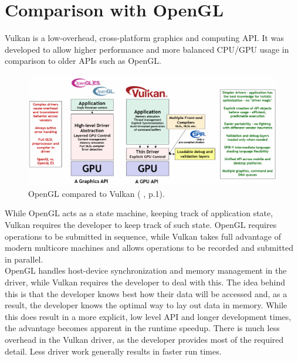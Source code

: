 \documentclass[12pt]{report}
\newcommand{\citediagram}[2]{(\citeauthor{#1} \citeyear{#1}, p.#2)}
\theoremstyle{definition}
\begin{document}
    \section{Comparison with OpenGL}

      Vulkan is a low-overhead, cross-platform graphics and computing API.
      It was developed to allow higher performance and more balanced CPU/GPU
      usage in comparison to older APIs such as OpenGL. \\

      \begin{figure}[h]
        \centering
        \includegraphics[width=\textwidth]{images/compare_opengl.png}
        \caption{OpenGL compared to Vulkan \citediagram{vulkan_guide}{1}.}
        \label{fig:compare_opengl}  
      \end{figure}

      While OpenGL acts as a state machine, keeping track of application state,
      Vulkan requires the developer to keep track of such state. OpenGL requires
      operations to be submitted in sequence, while Vulkan takes full advantage
      of modern multicore machines and allows operations to be recorded and
      submitted in parallel. \\

      OpenGL handles host-device synchronization and memory management in the
      driver, while Vulkan requires the developer to deal with this. The idea
      behind this is that the developer knows best how their data will be
      accessed and, as a result, the developer knows the optimal way to lay out
      data in memory. While this does result in a more explicit, low level API
      and longer development times, the advantage becomes apparent in the
      runtime speedup. There is much less overhead in the Vulkan driver, as the
      developer provides most of the required detail. Less driver work
      generally results in faster run times. \\
\end{document}
